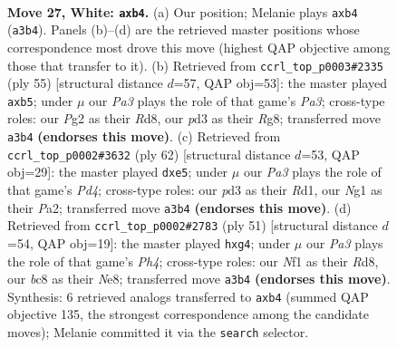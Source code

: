 \documentclass[11pt]{article}
\begin{document}
\clearpage

\begin{figure}[p]\centering
\begin{subfigure}{0.46\textwidth}\centering
\resizebox{\linewidth}{!}{%
\newchessgame
\chessboard[
  setfen={r1b1k1r1/5p2/4p3/6P1/pbn4p/P2p4/R5PP/1K3NNR w q - 0 27},
  showmover=false,
  pgfstyle=straightmove, color=movearrow, markmove={a3-b4}
]}
\caption{}
\end{subfigure}\hfill
\begin{subfigure}{0.46\textwidth}\centering
\resizebox{\linewidth}{!}{%
\newchessgame
\chessboard[
  setfen={3r2rk/5p1n/p3p2B/1BN1P3/3p4/P7/1PP2P1R/2K5 b - - 0 28},
  showmover=false,
  pgfstyle=straightmove, color=movearrow, markmove={a6-b5}
]}
\caption{}
\end{subfigure}
\\[4pt]
\begin{subfigure}{0.46\textwidth}\centering
\resizebox{\linewidth}{!}{%
\newchessgame
\chessboard[
  setfen={r5k1/p4p2/2p1r3/2PnbNpp/3P4/5R1P/P5P1/3R2K1 w - - 0 32},
  showmover=false,
  pgfstyle=straightmove, color=movearrow, markmove={d4-e5}
]}
\caption{}
\end{subfigure}\hfill
\begin{subfigure}{0.46\textwidth}\centering
\resizebox{\linewidth}{!}{%
\newchessgame
\chessboard[
  setfen={3rn1k1/pp3rp1/8/4P2p/P1Np2PP/5P1R/1P6/1K1R4 b - - 1 26},
  showmover=false,
  pgfstyle=straightmove, color=movearrow, markmove={h5-g4}
]}
\caption{}
\end{subfigure}
\caption{\textbf{Move 27, White: \texttt{axb4}.} (a) Our position; Melanie plays \texttt{axb4} (\texttt{a3b4}). Panels (b)--(d) are the retrieved master positions whose correspondence most drove this move (highest QAP objective among those that transfer to it). (b) Retrieved from \texttt{ccrl\_top\_p0003\#2335} (ply 55) [structural distance $d$=57, QAP obj=53]: the master played \texttt{axb5}; under $\mu$ our \emph{Pa3} plays the role of that game's \emph{Pa3}; cross-type roles: our \emph{P}g2 as their \emph{R}d8, our \emph{p}d3 as their \emph{R}g8; transferred move \texttt{a3b4} \textbf{(endorses this move)}. (c) Retrieved from \texttt{ccrl\_top\_p0002\#3632} (ply 62) [structural distance $d$=53, QAP obj=29]: the master played \texttt{dxe5}; under $\mu$ our \emph{Pa3} plays the role of that game's \emph{Pd4}; cross-type roles: our \emph{p}d3 as their \emph{R}d1, our \emph{N}g1 as their \emph{P}a2; transferred move \texttt{a3b4} \textbf{(endorses this move)}. (d) Retrieved from \texttt{ccrl\_top\_p0002\#2783} (ply 51) [structural distance $d$=54, QAP obj=19]: the master played \texttt{hxg4}; under $\mu$ our \emph{Pa3} plays the role of that game's \emph{Ph4}; cross-type roles: our \emph{N}f1 as their \emph{R}d8, our \emph{b}c8 as their \emph{N}e8; transferred move \texttt{a3b4} \textbf{(endorses this move)}. Synthesis: 6 retrieved analogs transferred to \texttt{axb4} (summed QAP objective 135, the strongest correspondence among the candidate moves); Melanie committed it via the \texttt{search} selector.}
\label{fig:thought-m52}
\end{figure}
\end{document}
